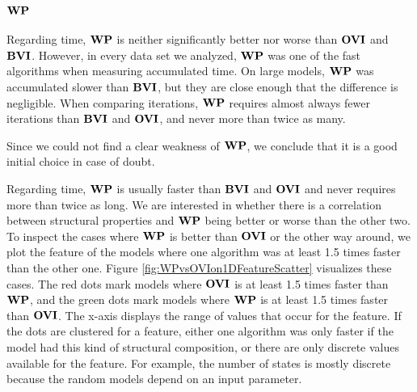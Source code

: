 \subsubsection*{$\mathbf{WP}$}
Regarding time, $\mathbf{WP}$ is neither significantly better nor worse than $\mathbf{OVI}$ and $\mathbf{BVI}$.
However, in every data set we analyzed, $\mathbf{WP}$ was one of the fast algorithms when measuring accumulated time.
On large models, $\mathbf{WP}$ was accumulated slower than $\mathbf{BVI}$, but they are close enough that the difference is negligible.
When comparing iterations, $\mathbf{WP}$ requires almost always fewer iterations than $\mathbf{BVI}$ and $\mathbf{OVI}$, and never more than twice as many.

Since we could not find a clear weakness of $\mathbf{WP}$, we conclude that it is a good initial choice in case of doubt.

\iffalse
Regarding time, $\mathbf{WP}$ is usually faster than $\mathbf{BVI}$ and $\mathbf{OVI}$ and never requires more than twice as long.
We are interested in whether there is a correlation between structural properties and $\mathbf{WP}$ being better or worse than the other two.
To inspect the cases where $\mathbf{WP}$ is better than $\mathbf{OVI}$ or the other way around, we plot the feature of the models where one algorithm was at least
1.5 times faster than the other one. Figure \ref{fig:WPvsOVIon1DFeatureScatter} visualizes these cases. 
The red dots mark models where $\mathbf{OVI}$ is at least 1.5 times faster than $\mathbf{WP}$, and the green dots mark models where $\mathbf{WP}$ is at least 1.5 times faster than $\mathbf{OVI}$.
The x-axis displays the range of values that occur for the feature. 
If the dots are clustered for a feature, either one algorithm was only faster if the model had this kind of structural composition, 
or there are only discrete values available for the feature. For example, the number of states is mostly discrete because the random models depend on an input parameter.

